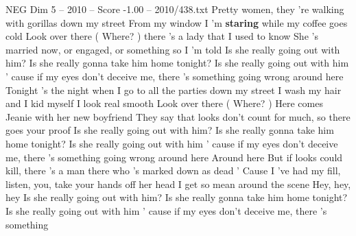 \begin{textsample}{NEG Dim 5 – 2010 – Score -1.00 – 2010/438.txt}  \label{ex:f5_neg_019}
Pretty women, they 're walking with gorillas down my street From my window I 'm \textbf{staring} while my coffee goes cold Look over there ( Where? ) there 's a lady that I used to know She 's married now, or engaged, or something so I 'm told Is she really going out with him?
Is she really gonna take him home tonight?
Is she really going out with him ' cause if my eyes don't deceive me, there 's something going wrong around here Tonight 's the night when I go to all the parties down my street I wash my hair and I kid myself I look real smooth Look over there ( Where? ) Here comes Jeanie with her new boyfriend They say that looks don't count for much, so there goes your proof Is she really going out with him?
Is she really gonna take him home tonight?
Is she really going out with him ' cause if my eyes don't deceive me, there 's something going wrong around here Around here But if looks could kill, there 's a man there who 's marked down as dead ' Cause I 've had my fill, listen, you, take your hands off her head I get so mean around the scene Hey, hey, hey Is she really going out with him?
Is she really gonna take him home tonight?
Is she really going out with him ' cause if my eyes don't deceive me, there 's something

\end{textsample}
